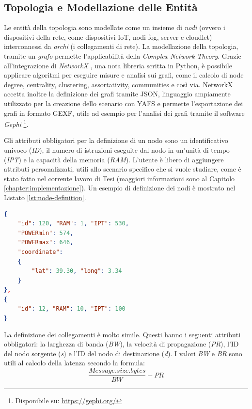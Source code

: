 \subsection{Topologia e Modellazione delle Entità}

Le entità della topologia sono modellate come un insieme di \textit{nodi} (ovvero i dispositivi della rete, come dispositivi IoT, nodi fog, server e cloudlet) interconnessi da \textit{archi} (i collegamenti di rete). La modellazione della topologia, tramite un \textit{grafo} permette l'applicabilità della \textit{Complex Network Theory}. Grazie all'integrazione di \textit{NetworkX}  \cite{NetworkX}, una nota libreria scritta in Python, è possibile applicare algoritmi per eseguire misure e analisi sui grafi, come il calcolo di node degree, centrality, clustering, assortativity, communities e così via. NetworkX accetta inoltre la definizione dei grafi tramite JSON, linguaggio ampiamente utilizzato per la creazione dello scenario con YAFS e permette l'esportazione dei grafi in formato GEXF, utile ad esempio per l'analisi dei grafi tramite il software \textit{Gephi} \footnote{Disponibile su: \url{https://gephi.org/}}.

Gli attributi obbligatori per la definizione di un nodo sono un identificativo univoco (\textit{ID}), il numero di istruzioni eseguite dal nodo in un'unità di tempo (\textit{IPT}) e la capacità della memoria (\textit{RAM}). L'utente è libero di aggiungere attributi personalizzati, utili allo scenario specifico che si vuole studiare, come è stato fatto nel corrente lavoro di Tesi (maggiori informazioni sono al Capitolo \ref{chapter:implementazione}). Un esempio di definizione dei nodi è mostrato nel Listato \ref{lst:node-definition}. 
\begin{lstlisting}[language=json, caption={Definizione di due nodi Fog utilizzando la rappresentazione JSON \cite{YAFSSimulator}}, captionpos=b, label={lst:node-definition}]
{
    "id": 120, "RAM": 1, "IPT": 530,
    "POWERmin": 574,
    "POWERmax": 646,
    "coordinate": 
    {
        "lat": 39.30, "long": 3.34
    }
},
{
    "id": 12, "RAM": 10, "IPT": 100
}
\end{lstlisting}

La definizione dei collegamenti è molto simile. Questi hanno i seguenti attributi obbligatori: la larghezza di banda (\textit{BW}), la velocità di propagazione (\textit{PR}), l'ID del nodo sorgente (\textit{s}) e l'ID del nodo di destinazione (\textit{d}). I valori \textit{BW} e \textit{BR} sono utili al calcolo della latenza secondo la formula:
$$\frac{Message.size.bytes}{BW} + PR$$

